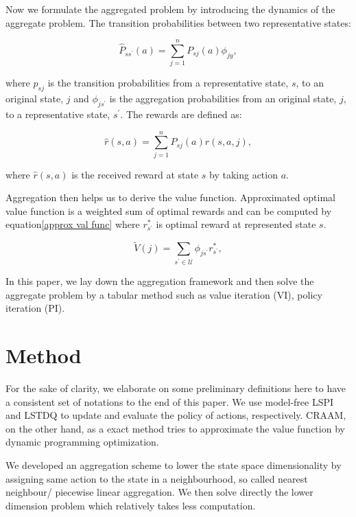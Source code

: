 \documentclass{article}
\begin{document}
    Now we formulate the aggregated problem by introducing the dynamics of the aggregate problem.
    The transition probabilities between two representative states:

    \begin{equation}
        \hat{P}_{s s^\prime}(a)=\sum_{j=1}^{n} P_{s j}(a) \phi_{j y},
    \end{equation}

    where $p_ {s j}$ is the transition probabilities from a representative state, $s$, to an original state, $j$
    and $\phi_{j s^\prime}$ is the aggregation probabilities from an original state, $j$, to a representative state,
    $s^\prime$.
    The rewards are defined as:

    \begin{equation}
        \hat{r}(s, a)=\sum_{j=1}^{n} P_{s j}(a) r(s, a, j),
    \end{equation}

    where $\hat{r}(s, a)$ is the received reward at state $s$ by taking action $a$.


    Aggregation then helps us to derive the value function.
    Approximated optimal value function is a weighted sum of optimal rewards and can be computed by
    equation\ref{approx val func} where $r_{s^\prime}^{\ast}$ is optimal reward at represented state $s$.

    \begin{equation}
        \label{approx val func}
        \tilde{V}(j)=\sum_{s^\prime \in \mathcal{U}} \phi_{j s^\prime} r_{s^\prime}^{\ast},
    \end{equation}

    In this paper, we lay down the aggregation framework and then solve the aggregate problem by a tabular method
    such as value iteration (VI), policy iteration (PI).

    \section{Method}
    For the sake of clarity, we elaborate on some preliminary definitions here to have a consistent set of notations
    to the end of this paper. We use model-free LSPI and LSTDQ \citep{Lagoudakis2003} to update and
    evaluate the policy of actions, respectively. CRAAM, on the other hand, as a exact method tries to approximate
    the value function by dynamic programming optimization.

    We developed an aggregation scheme to lower the state space dimensionality by assigning same action to the state
    in a neighbourhood, so called nearest neighbour/ piecewise linear aggregation.
    We then solve directly the lower dimension problem which relatively takes less computation.
\end{document}
